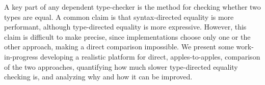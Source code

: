 A key part of any dependent type-checker is the method for checking whether two types are equal.
A common claim is that syntax-directed equality is more performant, although type-directed equality is more expressive.
However, this claim is difficult to make precise, since implementations choose only one or the other approach, making a direct comparison impossible.
We present some work-in-progress developing a realistic platform for direct, apples-to-apples, comparison of the two approaches, quantifying how much slower type-directed equality checking is, and analyzing why and how it can be improved.
